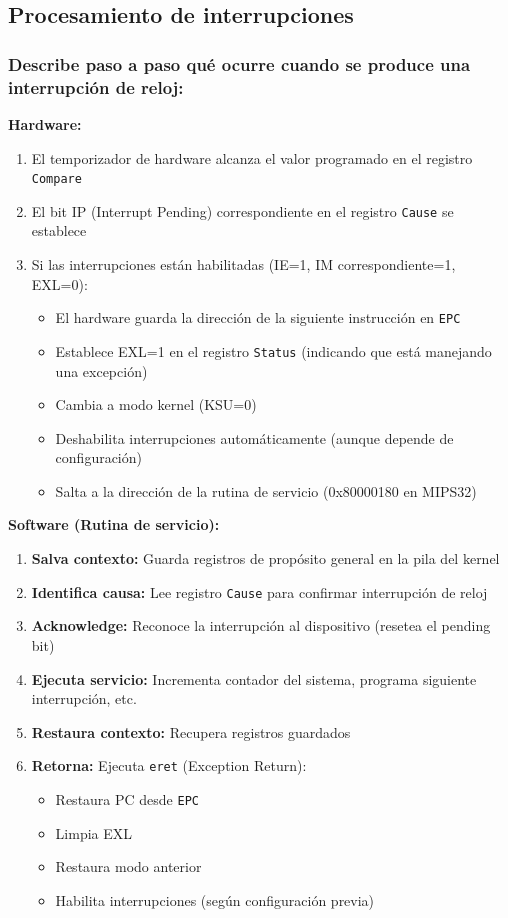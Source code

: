 \documentclass[12pt]{article}
\begin{document}
	\subsection{Procesamiento de interrupciones}
	
	\subsubsection{Describe paso a paso qué ocurre cuando se produce una interrupción de reloj:}
	
	\textbf{Hardware:}
	\begin{enumerate}
		\item El temporizador de hardware alcanza el valor programado en el registro \texttt{Compare}
		\item El bit IP (Interrupt Pending) correspondiente en el registro \texttt{Cause} se establece
		\item Si las interrupciones están habilitadas (IE=1, IM correspondiente=1, EXL=0):
		\begin{itemize}
			\item El hardware guarda la dirección de la siguiente instrucción en \texttt{EPC}
			\item Establece EXL=1 en el registro \texttt{Status} (indicando que está manejando una excepción)
			\item Cambia a modo kernel (KSU=0)
			\item Deshabilita interrupciones automáticamente (aunque depende de configuración)
			\item Salta a la dirección de la rutina de servicio (0x80000180 en MIPS32)
		\end{itemize}
	\end{enumerate}
	
	\textbf{Software (Rutina de servicio):}
	\begin{enumerate}
		\item \textbf{Salva contexto:} Guarda registros de propósito general en la pila del kernel
		\item \textbf{Identifica causa:} Lee registro \texttt{Cause} para confirmar interrupción de reloj
		\item \textbf{Acknowledge:} Reconoce la interrupción al dispositivo (resetea el pending bit)
		\item \textbf{Ejecuta servicio:} Incrementa contador del sistema, programa siguiente interrupción, etc.
		\item \textbf{Restaura contexto:} Recupera registros guardados
		\item \textbf{Retorna:} Ejecuta \texttt{eret} (Exception Return):
		\begin{itemize}
			\item Restaura PC desde \texttt{EPC}
			\item Limpia EXL
			\item Restaura modo anterior
			\item Habilita interrupciones (según configuración previa)
		\end{itemize}
	\end{enumerate}
	
\end{document}
